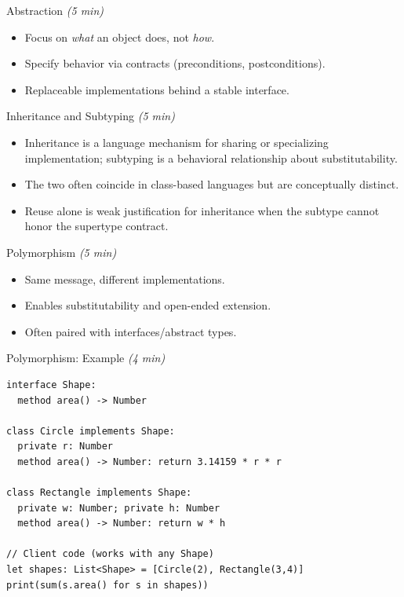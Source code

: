\documentclass[aspectratio=169,11pt]{beamer}
\newcommand{\mins}[1]{\textit{(#1 min)}}
\begin{document}
\begin{frame}{Abstraction \mins{5}}
  \begin{itemize}
    \item Focus on \emph{what} an object does, not \emph{how}.
    \item Specify behavior via contracts (preconditions, postconditions).
    \item Replaceable implementations behind a stable interface.
  \end{itemize}
\end{frame}

\begin{frame}{Inheritance and Subtyping \mins{5}}
  \begin{itemize}
    \item Inheritance is a language mechanism for sharing or specializing implementation; subtyping is a behavioral relationship about substitutability.
    \item The two often coincide in class-based languages but are conceptually distinct.
    \item Reuse alone is weak justification for inheritance when the subtype cannot honor the supertype contract.
  \end{itemize}
\end{frame}

\begin{frame}{Polymorphism \mins{5}}
  \begin{itemize}
    \item Same message, different implementations.
    \item Enables substitutability and open-ended extension.
    \item Often paired with interfaces/abstract types.
  \end{itemize}
\end{frame}

\begin{frame}[fragile]{Polymorphism: Example \mins{4}}
\begin{lstlisting}
interface Shape:
  method area() -> Number

class Circle implements Shape:
  private r: Number
  method area() -> Number: return 3.14159 * r * r

class Rectangle implements Shape:
  private w: Number; private h: Number
  method area() -> Number: return w * h

// Client code (works with any Shape)
let shapes: List<Shape> = [Circle(2), Rectangle(3,4)]
print(sum(s.area() for s in shapes))
\end{lstlisting}
\end{frame}
\end{document}
